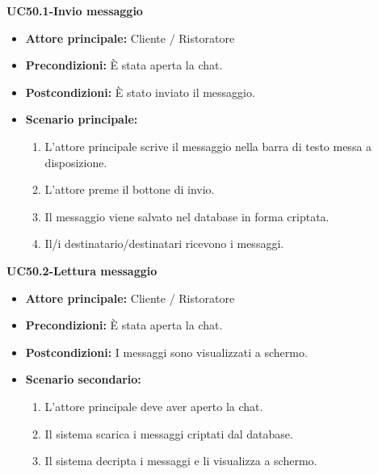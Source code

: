 \textbf{UC50.1-Invio messaggio}
\begin{itemize}
\item \textbf{Attore principale:} Cliente / Ristoratore
\item \textbf{Precondizioni:} È stata aperta la chat.
\item \textbf{Postcondizioni:} È stato inviato il messaggio.
\item \textbf{Scenario principale:}
\begin{enumerate}
    \item L'attore principale scrive il messaggio nella barra di testo messa a disposizione.
    \item L'attore preme il bottone di invio.
    \item Il messaggio viene salvato nel database in forma criptata.
    \item Il/i destinatario/destinatari ricevono i messaggi.
\end{enumerate}
\end{itemize}

\textbf{UC50.2-Lettura messaggio}
\begin{itemize}
\item \textbf{Attore principale:} Cliente / Ristoratore
\item \textbf{Precondizioni:} È stata aperta la chat.
\item \textbf{Postcondizioni:} I messaggi sono visualizzati a schermo.
\item \textbf{Scenario secondario:}
\begin{enumerate}
    \item L'attore principale deve aver aperto la chat.
    \item Il sistema scarica i messaggi criptati dal database.
    \item Il sistema decripta i messaggi e li visualizza a schermo.
\end{enumerate}
\end{itemize}
